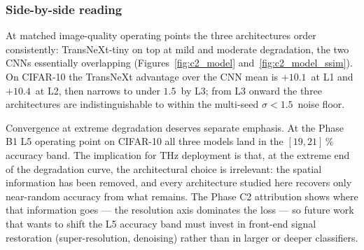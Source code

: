 \subsubsection{Side-by-side reading}
\label{sec:cm:sidebyside}

At matched image-quality operating points the three architectures order
consistently: TransNeXt-tiny on top at mild and moderate degradation, the two
CNNs essentially overlapping (Figures~\ref{fig:c2_model}
and~\ref{fig:c2_model_ssim}). On CIFAR-10 the TransNeXt advantage over the CNN
mean is $+10.1\,$\Mpp{} at L1 and $+10.4\,$\Mpp{} at L2, then narrows to under
$1.5\,$\Mpp{} by L3; from L3 onward the three architectures are
indistinguishable to within the multi-seed $\sigma < 1.5\,$\Mpp{} noise floor.

Convergence at extreme degradation deserves separate emphasis. At the Phase B1
L5 operating point on CIFAR-10 all three models land in the $[19, 21]\,\%$
accuracy band. The implication for THz deployment is that, at the extreme end
of the degradation curve, the architectural choice is irrelevant: the spatial
information has been removed, and every architecture studied here recovers only
near-random accuracy from what remains. The Phase C2 attribution shows where
that information goes --- the resolution axis dominates the loss --- so future
work that wants to shift the L5 accuracy band must invest in front-end signal
restoration (super-resolution, denoising) rather than in larger or deeper
classifiers.
